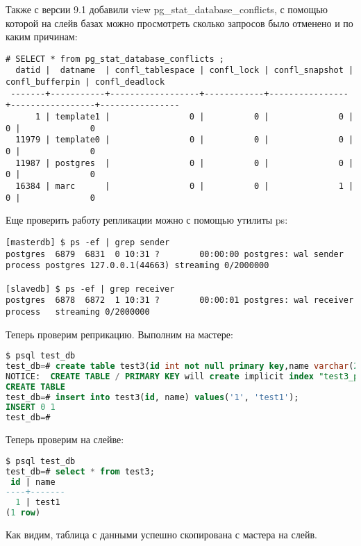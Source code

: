Также с версии 9.1 добавили view pg\_stat\_database\_conflicts, с помощью которой на слейв базах можно просмотреть сколько запросов было отменено и по каким причинам:

\begin{lstlisting}[label=lst:streaming152,caption=Состояние слейва]
# SELECT * from pg_stat_database_conflicts ;
  datid |  datname  | confl_tablespace | confl_lock | confl_snapshot | confl_bufferpin | confl_deadlock
 -------+-----------+------------------+------------+----------------+-----------------+----------------
      1 | template1 |                0 |          0 |              0 |               0 |              0
  11979 | template0 |                0 |          0 |              0 |               0 |              0
  11987 | postgres  |                0 |          0 |              0 |               0 |              0
  16384 | marc      |                0 |          0 |              1 |               0 |              0
\end{lstlisting}

Еще проверить работу репликации можно с помощью утилиты ps:
\begin{lstlisting}[label=lst:streaming16,caption=Тестирование репликации]
[masterdb] $ ps -ef | grep sender
postgres  6879  6831  0 10:31 ?        00:00:00 postgres: wal sender process postgres 127.0.0.1(44663) streaming 0/2000000

[slavedb] $ ps -ef | grep receiver
postgres  6878  6872  1 10:31 ?        00:00:01 postgres: wal receiver process   streaming 0/2000000
\end{lstlisting}

Теперь проверим реприкацию. Выполним на мастере:
\begin{lstlisting}[language=SQL,label=lst:streaming17,caption=Выполняем на мастере]
$ psql test_db
test_db=# create table test3(id int not null primary key,name varchar(20));
NOTICE:  CREATE TABLE / PRIMARY KEY will create implicit index "test3_pkey" for table "test3"
CREATE TABLE
test_db=# insert into test3(id, name) values('1', 'test1');
INSERT 0 1
test_db=#
\end{lstlisting}

Теперь проверим на слейве:
\begin{lstlisting}[language=SQL,label=lst:streaming18,caption=Выполняем на слейве]
$ psql test_db
test_db=# select * from test3;
 id | name
----+-------
  1 | test1
(1 row)
\end{lstlisting}

Как видим, таблица с данными успешно скопирована с мастера на слейв.

